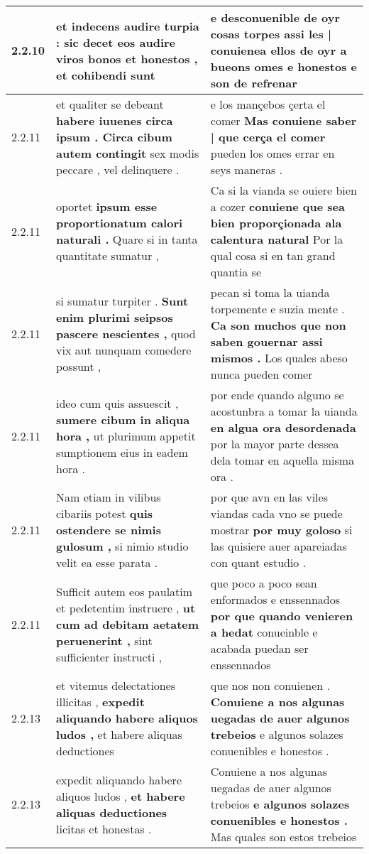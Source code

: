 \begin{tabular}{|p{1cm}|p{6.5cm}|p{6.5cm}|}
2.2.10 & et indecens audire turpia : \textbf{ sic decet eos audire viros bonos et honestos , } et cohibendi sunt & e desconuenible de oyr cosas torpes \textbf{ assi les | conuienea ellos de oyr a bueons omes e honestos } e son de refrenar \\\hline
2.2.11 & et qualiter se debeant \textbf{ habere iuuenes circa ipsum . Circa cibum autem contingit } sex modis peccare , vel delinquere . & e los mançebos çerta el comer \textbf{ Mas conuiene saber | que cerça el comer } pueden los omes errar en seys maneras . \\\hline
2.2.11 & oportet \textbf{ ipsum esse proportionatum calori naturali . } Quare si in tanta quantitate sumatur , & Ca si la vianda se ouiere bien a cozer \textbf{ conuiene que sea bien proporçionada ala calentura natural } Por la qual cosa si en tan grand quantia se \\\hline
2.2.11 & si sumatur turpiter . \textbf{ Sunt enim plurimi seipsos pascere nescientes , } quod vix aut nunquam comedere possunt , & pecan si toma la uianda torpemente e suzia mente . \textbf{ Ca son muchos que non saben gouernar assi mismos . } Los quales abeso nunca pueden comer \\\hline
2.2.11 & ideo cum quis assuescit , \textbf{ sumere cibum in aliqua hora , } ut plurimum appetit sumptionem eius in eadem hora . & por ende quando alguno se acostunbra a tomar la uianda \textbf{ en algua ora desordenada } por la mayor parte dessea dela tomar en aquella misma ora . \\\hline
2.2.11 & Nam etiam in vilibus cibariis potest \textbf{ quis ostendere se nimis gulosum , } si nimio studio velit ea esse parata . & por que avn en las viles viandas cada vno se puede mostrar \textbf{ por muy goloso } si las quisiere auer apareiadas con quant estudio . \\\hline
2.2.11 & Sufficit autem eos paulatim et pedetentim instruere , \textbf{ ut cum ad debitam aetatem peruenerint , } sint sufficienter instructi , & que poco a poco sean enformados e enssennados \textbf{ por que quando venieren a hedat } conueinble e acabada puedan ser enssennados \\\hline
2.2.13 & et vitemus delectationes illicitas , \textbf{ expedit aliquando habere aliquos ludos , } et habere aliquas deductiones & que nos non conuienen . \textbf{ Conuiene a nos algunas uegadas de auer algunos trebeios } e algunos solazes conuenibles e honestos . \\\hline
2.2.13 & expedit aliquando habere aliquos ludos , \textbf{ et habere aliquas deductiones } licitas et honestas . & Conuiene a nos algunas uegadas de auer algunos trebeios \textbf{ e algunos solazes conuenibles e honestos . } Mas quales son estos trebeios \\\hline

\end{tabular}
